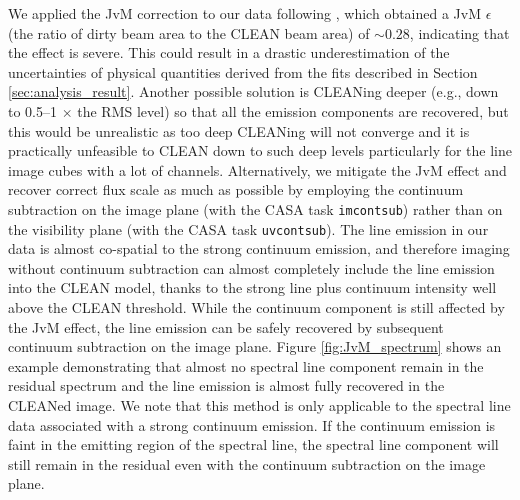 \documentclass[linenumbers, twocolumn, twocolappendix, astrosymb, times]{aastex631}
\begin{document}
We applied the JvM correction to our data following \citet{Czekala2021}, which obtained a JvM $\epsilon$ (the ratio of dirty beam area to the CLEAN beam area) of $\sim0.28$, indicating that the effect is severe. This could result in a drastic underestimation of the uncertainties of physical quantities derived from the fits described in Section \ref{sec:analysis_result}. Another possible solution is CLEANing deeper (e.g., down to 0.5--1 $\times$ the RMS level) so that all the emission components are recovered, but this would be unrealistic as too deep CLEANing will not converge and it is practically unfeasible to CLEAN down to such deep levels particularly for the line image cubes with a lot of channels. Alternatively, we mitigate the JvM effect and recover correct flux scale as much as possible by employing the continuum subtraction on the image plane (with the CASA task \texttt{imcontsub}) rather than on the visibility plane (with the CASA task \texttt{uvcontsub}). The line emission in our data is almost co-spatial to the strong continuum emission, and therefore imaging without continuum subtraction can almost completely include the line emission into the CLEAN model, thanks to the strong line plus continuum intensity well above the CLEAN threshold. While the continuum component is still affected by the JvM effect, the line emission can be safely recovered by subsequent continuum subtraction on the image plane. Figure \ref{fig:JvM_spectrum} shows an example demonstrating that almost no spectral line component remain in the residual spectrum and the line emission is almost fully recovered in the CLEANed image. We note that this method is only applicable to the spectral line data associated with a strong continuum emission. If the continuum emission is faint in the emitting region of the spectral line, the spectral line component will still remain in the residual even with the continuum subtraction on the image plane. 

\begin{figure*}
\caption{Line plus continuum spectra of SPW 2 averaged over 1 aperture for the CLEAN image (dark grey), the CLEAN model (grey), and the residual (light grey). The CLEAN model spectrum (in unit of Jy pixel$^{-1}$ by default) is scaled up by a ratio of the CLEAN beam area to the pixel area for visual clarity. The spectral line emission is almost fully recovered into the CLEAN model and none of that remains in the residual spectrum. The horizontal dashed line indicates the zero-flux level.}
\label{fig:JvM_spectrum}
\end{figure*}
\end{document}
